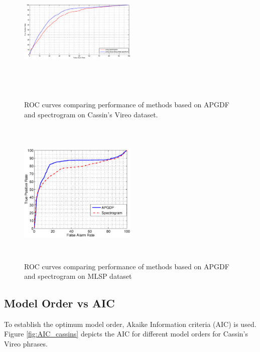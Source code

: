 \documentclass[a4paper]{article}
\begin{document}
\begin{figure}[h]
\centering
\includegraphics[width=0.5\textwidth,height=7cm]{ROC_gr_delay_5_VS_spectrogram.eps}
\caption{ROC  curves  comparing  performance  of  methods based on APGDF and 
spectrogram on Cassin's Vireo dataset.}
\label{fig:ROCdata1}
\end{figure}
 
\begin{figure}[!ht]
	\centering
	\includegraphics[width=0.5\textwidth,height=7cm] {ROC_gr_delay_10_VS_spectrogram_data2.eps}
	\caption{ROC curves comparing performance of methods based on APGDF and spectrogram on MLSP dataset }   
	\label{fig:ROCdata2}
\end{figure} 




 \subsection{Model Order  vs AIC}
 
 
 To establish the optimum model order, Akaike Information criteria (AIC)  \cite{makhoul} is used. Figure \ref{fig:AIC_cassins} depicts the AIC for different model orders for Cassin's Vireo phrases.  
 
\end{document}
